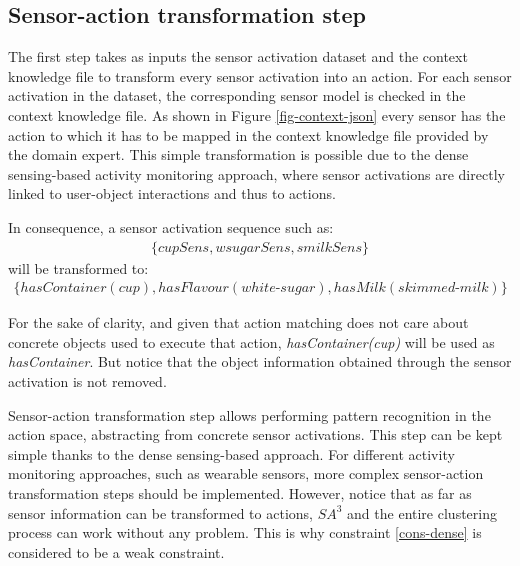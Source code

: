 
\subsection{Sensor-action transformation step}
\label{subsec:clustering:sa3:transform}

The first step takes as inputs the sensor activation dataset and the context knowledge file to transform every sensor activation into an action. For each sensor activation in the dataset, the corresponding sensor model is checked in the context knowledge file. As shown in Figure \ref{fig-context-json} every sensor has the action to which it has to be mapped in the context knowledge file provided by the domain expert. This simple transformation is possible due to the dense sensing-based activity monitoring approach, where sensor activations are directly linked to user-object interactions and thus to actions. 

In consequence, a sensor activation sequence such as:
 \begin{equation*}
 \begin{split}
   \{cupSens, wsugarSens, smilkSens\}
 \end{split}  
 \end{equation*}
 will be transformed to:
 \begin{equation*}
 \begin{split}
  \{hasContainer(cup), hasFlavour(white\text{-}sugar), hasMilk(skimmed\text{-}milk)\}
 \end{split}   
 \end{equation*}
 
For the sake of clarity, and given that action matching does not care about concrete objects used to execute that action, \textit{hasContainer(cup)} will be used as \textit{hasContainer}. But notice that the object information obtained through the sensor activation is not removed. 

Sensor-action transformation step allows performing pattern recognition in the action space, abstracting from concrete sensor activations. This step can be kept simple thanks to the dense sensing-based approach. For different activity monitoring approaches, such as wearable sensors, more complex sensor-action transformation steps should be implemented. However, notice that as far as sensor information can be transformed to actions, $SA^3$ and the entire clustering process can work without any problem. This is why constraint \ref{cons-dense} is considered to be a weak constraint.

